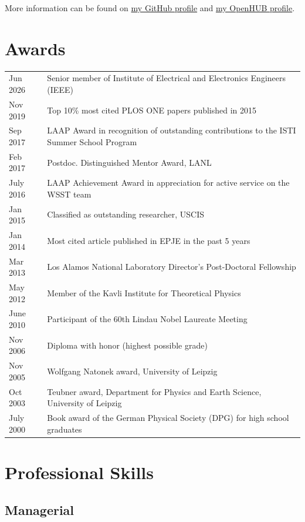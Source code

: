 \documentclass{article}
\begin{document}
More information can be found on \href{http://www.github.com/junghans}{my GitHub profile} and \href{http://www.openhub.net/accounts/junghans}{my OpenHUB profile}.

\section*{Awards}
\begin{tabular}{ll}
Jun 2026 & Senior member of Institute of Electrical and Electronics Engineers (IEEE) \\
Nov 2019 & Top 10\% most cited PLOS ONE papers published in 2015 \\
Sep 2017 & LAAP Award in recognition of outstanding contributions to the ISTI Summer School Program \\
Feb 2017 & Postdoc. Distinguished Mentor Award, LANL \\
July 2016 & LAAP Achievement Award in appreciation for active service on the WSST team \\
Jan 2015 & Classified as outstanding researcher, USCIS \\
Jan 2014 & Most cited article published in EPJE in the past 5 years \\
Mar 2013 & Los Alamos National Laboratory Director's Post-Doctoral Fellowship \\
May 2012 & Member of the Kavli Institute for Theoretical Physics\\
June 2010 & Participant of the 60th Lindau Nobel Laureate Meeting\\
Nov 2006 & Diploma with honor (highest possible grade) \\
Nov 2005  & Wolfgang Natonek award, University of Leipzig\\
Oct 2003  & Teubner award, Department for Physics and Earth Science, University of Leipzig\\
July 2000 & Book award of the German Physical Society (DPG) for high school graduates\\
\end{tabular}

\section*{Professional Skills}

\subsection*{Managerial}
\end{document}
